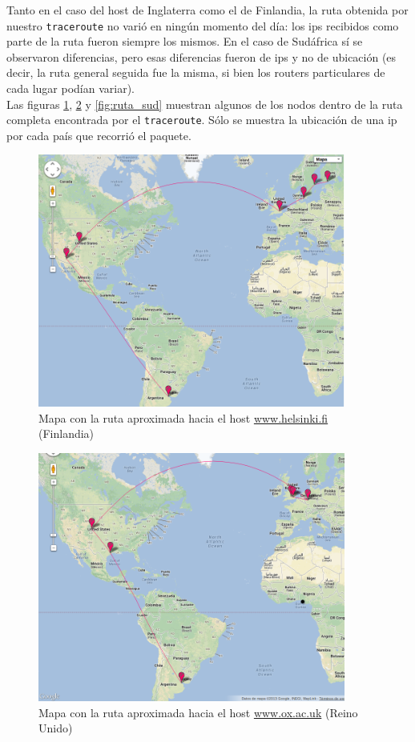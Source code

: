 Tanto en el caso del host de Inglaterra como el de Finlandia, la ruta obtenida por nuestro \texttt{traceroute} no varió en ningún momento del día: los ips recibidos como parte de la ruta fueron siempre los mismos. En el caso de Sudáfrica sí se observaron diferencias, pero esas diferencias fueron de ips y no de ubicación (es decir, la ruta general seguida fue la misma, si bien los routers particulares de cada lugar podían variar).\\

Las figuras \ref{fig:ruta_fin}, \ref{fig:ruta_ing} y \ref{fig:ruta_sud} muestran algunos de los nodos dentro de la ruta completa encontrada por el \texttt{traceroute}. Sólo se muestra la ubicación de una ip por cada país que recorrió el paquete.

\begin{figure}[H]
  \centering
    \includegraphics[width=0.9\textwidth]{imgs/finlandia_ruta_1.png}
    \caption{Mapa con la ruta aproximada hacia el host \url{www.helsinki.fi} (Finlandia)}
    \label{fig:ruta_fin}
\end{figure}    

\begin{figure}[H]
  \centering
    \includegraphics[width=0.9\textwidth]{imgs/inglaterra_ruta_1.png}
    \caption{Mapa con la ruta aproximada hacia el host \url{www.ox.ac.uk} (Reino Unido)}
    \label{fig:ruta_ing}
\end{figure}

